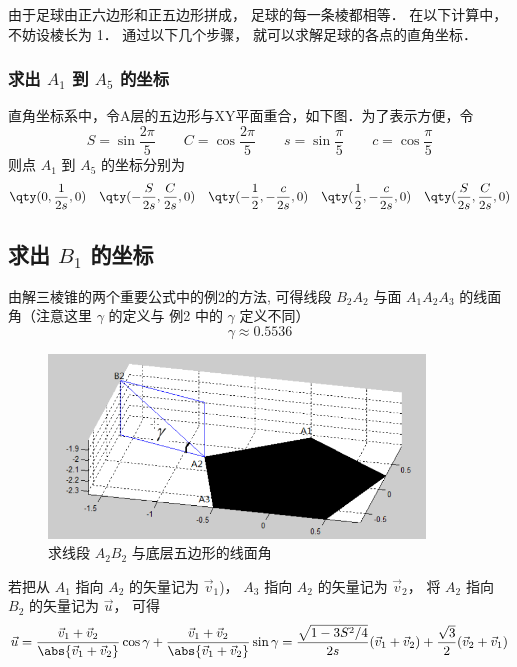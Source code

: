 由于足球由正六边形和正五边形拼成， 足球的每一条棱都相等． 在以下计算中， 不妨设棱长为 1． 通过以下几个步骤， 就可以求解足球的各点的直角坐标．

\subsubsection{求出 $A_1$ 到 $A_5$ 的坐标}
直角坐标系中，令A层的五边形与XY平面重合，如下图．为了表示方便，令
\begin{equation}
S = \sin\frac{2\pi}{5} \qquad
C = \cos\frac{2\pi}{5} \qquad
s = \sin\frac{\pi}{5} \qquad
c = \cos\frac{\pi}{5}
\end{equation}
则点 $A_1$ 到 $A_5$ 的坐标分别为
\begin{equation}\label{FootBl_eq5}
\qty(0, \frac{1}{2s}, 0) \quad
\qty(-\frac{S}{2s}, \frac{C}{2s}, 0) \quad
\qty(-\frac12, -\frac{c}{2s}, 0) \quad
\qty(\frac12, -\frac{c}{2s}, 0) \quad
\qty(\frac{S}{2s}, \frac{C}{2s}, 0)
\end{equation}

\subsection{求出 $B_1$ 的坐标}
由解三棱锥的两个重要公式中的例2的方法, 可得线段 $B_2 A_2$ 与面 $A_1A_2A_3$ 的线面角（注意这里 $\gamma$ 的定义与 例2 中的 $\gamma$ 定义不同）
\begin{equation}
\gamma \approx 0.5536
\end{equation}

\begin{figure}[ht]
\centering
\includegraphics[width=10cm]{./figures/FootBl4.png}
\caption{求线段 $A_2 B_2$ 与底层五边形的线面角} \label{FootBl_fig4}
\end{figure}

若把从 $A_1$ 指向 $A_2$ 的矢量记为 $\vec v_1$)， $A_3$ 指向 $A_2$ 的矢量记为 $\vec v_2$， 将 $A_2$ 指向 $B_2$ 的矢量记为 $\vec u$， 可得
\begin{equation}
\vec u = \frac{\vec v_1 + \vec v_2}{\abs{\vec v_1 + \vec v_2}} \cos\gamma
+ \frac{\vec v_1 + \vec v_2}{\abs{\vec v_1 + \vec v_2}} \sin\gamma
= \frac{\sqrt{1 - 3S^2/4}}{2s} (\vec v_1 + \vec v_2) + \frac{\sqrt{3}}{2} (\vec v_2 + \vec v_1)
\end{equation}

